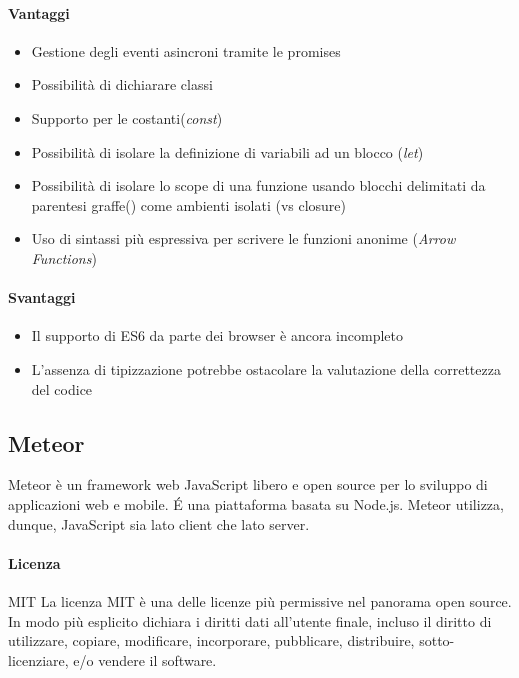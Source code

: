 \paragraph{Vantaggi}
\begin{itemize}
	\item Gestione degli eventi asincroni tramite le promises
	\item Possibilità di dichiarare classi
	\item Supporto per le costanti(\emph{const})
	\item Possibilità di isolare la definizione di variabili ad un blocco (\emph{let})
	\item Possibilità di isolare lo scope di una funzione usando blocchi delimitati da parentesi graffe({}) come ambienti isolati (vs closure)
	\item Uso di sintassi più espressiva per scrivere le funzioni anonime (\emph{Arrow Functions})
	
\end{itemize}

\paragraph{Svantaggi} 
\begin{itemize}
	\item Il supporto di ES6 da parte dei browser è ancora incompleto
	\item L’assenza di tipizzazione potrebbe ostacolare la valutazione della correttezza del codice
\end{itemize}

\subsection{Meteor}

Meteor è un framework web JavaScript libero e open source  per lo
sviluppo di applicazioni web e mobile. \'E una piattaforma basata su
Node.js. Meteor utilizza, dunque, JavaScript sia lato client che lato
server.  
\\
\paragraph{Licenza} MIT 
La licenza MIT è una delle licenze più permissive nel panorama open
source. In modo più esplicito dichiara i diritti dati all'utente
finale, incluso il diritto di utilizzare, copiare, modificare,
incorporare, pubblicare, distribuire, sotto-licenziare, e/o vendere il
software. 


